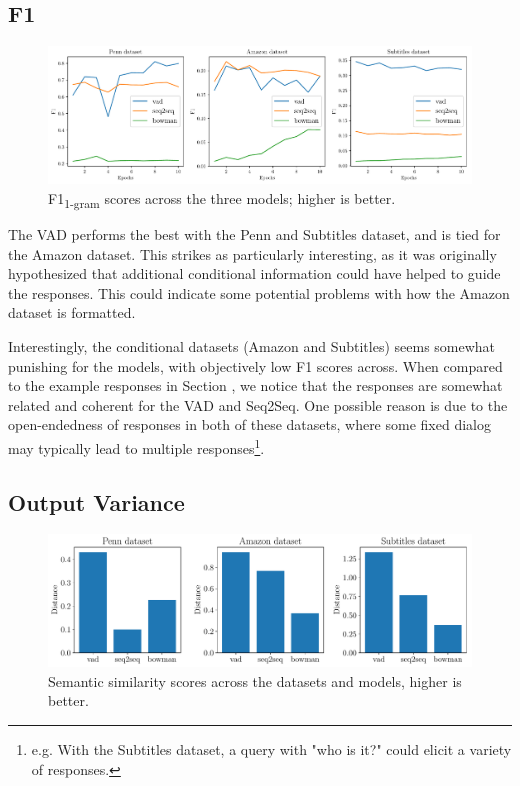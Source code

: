 \documentclass[12pt,twoside]{report}
\begin{document}
\subsection{F1}

\begin{figure}[!ht]
	\centering
	\includegraphics[width=150mm]{results/f1.pdf}
	\caption{F1\textsubscript{1-gram} scores across the three models; higher is better.\label{r:f1}}
	\end{figure}
	
The VAD performs the best with the Penn and Subtitles dataset, and is tied for the Amazon dataset. This strikes as particularly interesting, as it was originally hypothesized that additional conditional information could have helped to guide the responses. This could indicate some potential problems with how the Amazon dataset is formatted. 

Interestingly, the conditional datasets (Amazon and Subtitles) seems somewhat punishing for the models, with objectively low F1 scores across. When compared to the example responses in Section \label{sampling_examples}, we notice that the responses are somewhat related and coherent for the VAD and Seq2Seq. One possible reason is due to the open-endedness of responses in both of these datasets, where some fixed dialog may typically lead to multiple responses\footnote{e.g. With the Subtitles dataset, a query with "who is it?" could elicit a variety of responses.}.


\subsection{Output Variance}

\begin{figure}[!ht]
	\centering
	\includegraphics[width=150mm]{results/semantic_similarity.pdf}
	\caption{Semantic similarity scores across the datasets and models, higher is better.\label{r:variance}}
	\end{figure}
\end{document}
